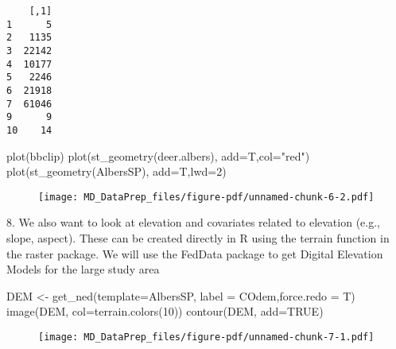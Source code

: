 \documentclass[
  letterpaper,
]{book}
\newenvironment{Shaded}{\begin{snugshade}}{\end{snugshade}}
\newcommand{\AttributeTok}[1]{\textcolor[rgb]{0.40,0.45,0.13}{#1}}
\newcommand{\ConstantTok}[1]{\textcolor[rgb]{0.56,0.35,0.01}{#1}}
\newcommand{\DecValTok}[1]{\textcolor[rgb]{0.68,0.00,0.00}{#1}}
\newcommand{\FunctionTok}[1]{\textcolor[rgb]{0.28,0.35,0.67}{#1}}
\newcommand{\NormalTok}[1]{\textcolor[rgb]{0.00,0.23,0.31}{#1}}
\newcommand{\OtherTok}[1]{\textcolor[rgb]{0.00,0.23,0.31}{#1}}
\newcommand{\StringTok}[1]{\textcolor[rgb]{0.13,0.47,0.30}{#1}}
\begin{document}
\begin{verbatim}
    [,1]
1      5
2   1135
3  22142
4  10177
5   2246
6  21918
7  61046
9      9
10    14
\end{verbatim}

\begin{Shaded}
\begin{Highlighting}[]
\FunctionTok{plot}\NormalTok{(bbclip)}
\FunctionTok{plot}\NormalTok{(}\FunctionTok{st\_geometry}\NormalTok{(deer.albers), }\AttributeTok{add=}\NormalTok{T,}\AttributeTok{col=}\StringTok{"red"}\NormalTok{)}
\FunctionTok{plot}\NormalTok{(}\FunctionTok{st\_geometry}\NormalTok{(AlbersSP), }\AttributeTok{add=}\NormalTok{T,}\AttributeTok{lwd=}\DecValTok{2}\NormalTok{)}
\end{Highlighting}
\end{Shaded}

\begin{figure}[H]

{\centering \texttt{[image: MD\_DataPrep\_files/figure-pdf/unnamed-chunk-6-2.pdf]}

}

\end{figure}

8. We also want to look at elevation and covariates related to elevation
(e.g., slope, aspect). These can be created directly in R using the
terrain function in the raster package. We will use the FedData package
to get Digital Elevation Models for the large study area

\begin{Shaded}
\begin{Highlighting}[]
\NormalTok{DEM }\OtherTok{\textless{}{-}} \FunctionTok{get\_ned}\NormalTok{(}\AttributeTok{template=}\NormalTok{AlbersSP, }\AttributeTok{label =} \StringTok{\textquotesingle{}COdem\textquotesingle{}}\NormalTok{,}\AttributeTok{force.redo =}\NormalTok{ T)}
\FunctionTok{image}\NormalTok{(DEM, }\AttributeTok{col=}\FunctionTok{terrain.colors}\NormalTok{(}\DecValTok{10}\NormalTok{))}
\FunctionTok{contour}\NormalTok{(DEM, }\AttributeTok{add=}\ConstantTok{TRUE}\NormalTok{)}
\end{Highlighting}
\end{Shaded}

\begin{figure}[H]

{\centering \texttt{[image: MD\_DataPrep\_files/figure-pdf/unnamed-chunk-7-1.pdf]}

}

\end{figure}
\end{document}
